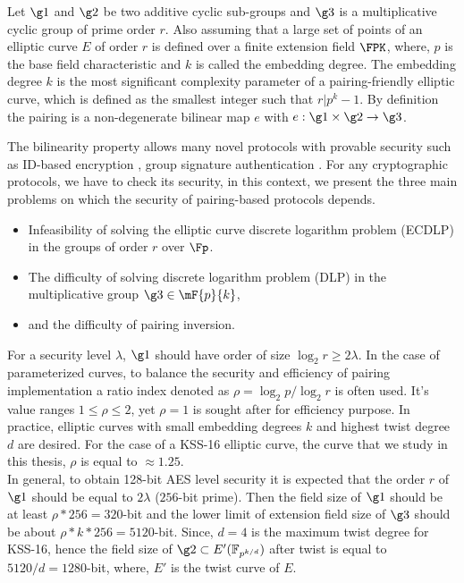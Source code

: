 Let $\g1$ and $\g2$ be two additive cyclic sub-groups and $\g3$ is a multiplicative cyclic group of prime order $r$.
Also assuming that a large set of points of an elliptic curve $E$ of order $r$ is defined over a finite extension field $\FPK$, where, $p$ is the base field characteristic and $k$ is called the embedding degree.
 The embedding degree $k$ is the most significant complexity parameter of a pairing-friendly elliptic curve, which is defined as the smallest integer such that $r|p^k-1$. 
By definition the pairing is a non-degenerate bilinear map  $e$ with $e: \g1 \times \g2 \to \g3 $.

The bilinearity property allows many novel protocols with provable security such as  ID-based encryption \cite{AC:BonLynSha01},  group signature authentication \cite{C:BonBoySha04}.
For any cryptographic protocols, we have to check its security, in this context, we present the three main problems on which the security of pairing-based protocols depends.
\begin{itemize}
	\item  Infeasibility of solving the elliptic curve discrete logarithm problem (ECDLP) in the groups of order $r$ over $\Fp$.
	\item The  difficulty of solving discrete logarithm problem (DLP) in the multiplicative group $\g3 \in \mF{p}{k}$,
	\item and the difficulty of pairing inversion.
\end{itemize}
For a security level $\lambda$, $\g1$ should have order of size $\log_2 r \geq 2\lambda$.  
In the case of parameterized curves, to balance the security and efficiency of pairing implementation a ratio index denoted as $\rho = \log_2 p/ \log_2 r$ is often used.
It's value ranges $1\leq  \rho  \leq 2$, yet $\rho=1$ is sought after for efficiency purpose. 
In practice, elliptic curves with small embedding degrees $k$ and highest twist degree $d$ are desired.
For the case of a KSS-16 elliptic curve, the curve that we study in this thesis, $\rho$ is equal to  $ \approx 1.25$. \\
In general, to obtain 128-bit AES level security it is expected that the order $r$ of $\g1$ should be equal to $2\lambda $ ($256$-bit prime).
Then the field size  of  $\g1$ should be at least $\rho*256 = 320$-bit and the lower limit of extension field size of $\g3$ should be about $\rho*k*256= 5120$-bit.
Since,  $d=4$ is the maximum twist degree for KSS-16, hence the field size of $\g2 \subset E'(\mathbb{F}_{p^{k/d}})$ after twist is  equal to $5120/d=1280$-bit, where, $E'$ is the twist curve of $E$.


